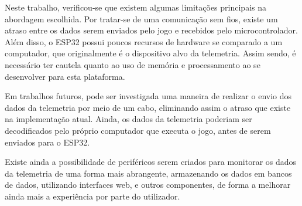 \documentclass[12pt]{article}
\begin{document}
Neste trabalho, verificou-se que existem algumas limitações principais na abordagem escolhida.
Por tratar-se de uma comunicação sem fios, existe um atraso entre os dados serem enviados pelo jogo e recebidos pelo microcontrolador.
Além disso, o ESP32 possui poucos recursos de hardware se comparado a um computador, que originalmente é o dispositivo alvo da telemetria.
Assim sendo, é necessário ter cautela quanto ao uso de memória e processamento ao se desenvolver para esta plataforma.

Em trabalhos futuros, pode ser investigada uma maneira de realizar o envio dos dados da telemetria por meio de um cabo, eliminando assim
o atraso que existe na implementação atual.
Ainda, os dados da telemetria poderiam ser decodificados pelo próprio computador que executa o jogo,
antes de serem enviados para o ESP32.

Existe ainda a possibilidade de periféricos serem criados para monitorar os dados da telemetria
de uma forma mais abrangente, armazenando os dados em bancos de dados, utilizando interfaces web,
e outros componentes, de forma a melhorar ainda mais a experiência por parte do utilizador.



\end{document}
